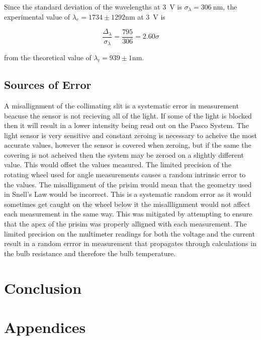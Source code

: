 \documentclass[a4paper]{article}
\begin{document}
Since the standard deviation of the wavelengths at \SI{3}{\volt} is \(
\sigma_{\lambda} = \SI{306}{\nano\meter} \), the experimental value of \(
\lambda_e = 1734 \pm 1292 \si{\nano\meter} \) at \SI{3}{\volt} is

\begin{equation*}
  \frac{\Delta_{\lambda}}{\sigma_{\lambda}} = \frac{795}{306} = 2.60 \sigma
\end{equation*}

from the theoretical value of \( \lambda_t = 939 \pm 1 \si{\nano\meter} \).

\qq 

\subsection{Sources of Error}

\qq A misallignment of the collimating slit is a systematic error in
measurement beacuse the sensor is not recieving all of the light. If
some of the light is blocked then it will result in a lower intensity
being read out on the Pasco System. The light sensor is very sensitive
and constant zeroing is necessary to acheive the most accurate values,
however the sensor is covered when zeroing, but if the same the
covering is not acheived then the system may be zeroed on a slightly
different value. This would offset the values measured. The limited
precision of the rotating wheel used for angle measurements causes a
random intrinsic error to the values. The misallignment of the prisim
would mean that the geometry used in Snell's Law would be
incorrect. This is a systematic random error as it would sometimes get
caught on the wheel below it the misalllignment would not affect each
measurement in the same way. This was mitigated by attempting to
ensure that the apex of the prisim was properly alligned with each
measurement. The limited precision on the multimeter readings for both
the voltage and the current result in a random errror in measurement
that propagates through calculations in the bulb resistance and
therefore the bulb temperature.

\section{Conclusion}

\section{Appendices}
\end{document}
